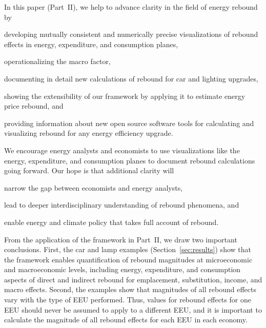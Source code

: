 \documentclass[12pt]{article}\usepackage[]{graphicx}\usepackage[]{xcolor}
\begin{document}
In this paper (Part~II), we help to advance clarity in the field of energy rebound
by
%
\begin{enumerate*}[label={(\roman*)}]

  \item developing mutually consistent and numerically precise
        visualizations of rebound effects
        in energy, expenditure, and consumption planes,

  \item operationalizing the macro factor,

  \item documenting in detail new calculations of rebound
        for car and lighting
        upgrades,

  \item showing the extensibility of our framework
        by applying it to estimate energy price rebound, and

  \item providing information about new open source software tools
        for calculating and visualizing rebound
        for any energy efficiency upgrade.

\end{enumerate*}
%
We encourage energy analysts and economists to use visualizations
like the energy, expenditure, and consumption planes
to document rebound calculations going forward.
Our hope is that additional clarity will
%
\begin{enumerate*}[label={(\roman*)}]

  \item narrow the gap between economists and energy analysts,

  \item lead to deeper interdisciplinary understanding
        of rebound phenomena, and

  \item enable energy and climate policy
        that takes full account of rebound.

\end{enumerate*}

From the application of the framework in Part~II,
we draw two important conclusions.
First, the car and lamp examples (Section~\ref{sec:results}) show that
        the framework enables
        quantification of rebound magnitudes
        at microeconomic and macroeconomic levels, including
        energy, expenditure, and consumption aspects of
        direct and indirect rebound
        for emplacement, substitution, income, and macro effects.
Second, the examples show that magnitudes of all rebound effects
        vary with the type of EEU performed.
Thus, values for rebound effects
for one EEU should never be assumed to apply to a different EEU, and
it is important to calculate the magnitude of all rebound effects
for each EEU in each economy.
\end{document}
